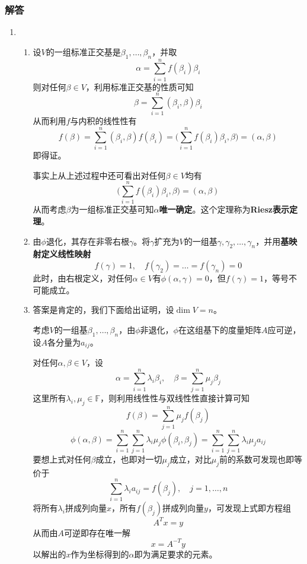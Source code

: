 \documentclass[a4paper,UTF8,fontset=windows,AutoFakeBold]{ctexart}
\newcommand*{\note}{\noindent *}
\begin{document}
\subsubsection{解答}
\begin{enumerate}
    \item
    \begin{enumerate}
        \item 设$V$的一组标准正交基是$\beta_1,\dots,\beta_n$，并取
        $$\alpha=\sum_{i=1}^nf(\beta_i)\beta_i$$
        则对任何$\beta\in V$，利用标准正交基的性质可知
        $$\beta=\sum_{i=1}^n(\beta_i,\beta)\beta_i$$
        从而利用$f$与内积的线性性有
        $$f(\beta)=\sum_{i=1}^n(\beta_i,\beta)f(\beta_i)=\bigg(\sum_{i=1}^nf(\beta_i)\beta_i,\beta\bigg)=(\alpha,\beta)$$
        即得证。

        \note 事实上从上述过程中还可看出对任何$\beta\in V$均有
        $$\bigg(\sum_{i=1}^nf(\beta_i)\beta_i,\beta\bigg)=(\alpha,\beta)$$
        从而考虑$\beta$为一组标准正交基可知$\alpha$\textbf{唯一确定}。这个定理称为\textbf{Riesz表示定理}。

        \item 
        由$\phi$退化，其存在非零右根$\gamma$。将$\gamma$扩充为$V$的一组基$\gamma,\gamma_2,\dots,\gamma_n$，并用\textbf{基映射定义线性映射}
        $$f(\gamma)=1,\quad f(\gamma_2)=\dots=f(\gamma_n)=0$$
        此时，由右根定义，对任何$\alpha\in V$有$\phi(\alpha,\gamma)=0$，但$f(\gamma)=1$，等号不可能成立。

        \item 答案是肯定的，我们下面给出证明，设$\dim V=n$。
        
        考虑$V$的一组基$\beta_1,\dots,\beta_n$，由$\phi$非退化，$\phi$在这组基下的度量矩阵$A$应可逆，设$A$各分量为$a_{ij}$。

        对任何$\alpha,\beta\in V$，设
        $$\alpha=\sum_{i=1}^n\lambda_i\beta_i,\quad\beta=\sum_{j=1}^n\mu_j\beta_j$$
        这里所有$\lambda_i,\mu_j\in\mathbb{F}$，则利用线性性与双线性性直接计算可知
        $$f(\beta)=\sum_{j=1}^n\mu_jf(\beta_j)$$
        $$\phi(\alpha,\beta)=\sum_{i=1}^n\sum_{j=1}^n\lambda_i\mu_j\phi(\beta_i,\beta_j)=\sum_{i=1}^n\sum_{j=1}^n\lambda_i\mu_ja_{ij}$$
        要想上式对任何$\beta$成立，也即对一切$\mu_j$成立，对比$\mu_j$前的系数可发现也即等价于
        $$\sum_{i=1}^n\lambda_ia_{ij}=f(\beta_j),\quad j=1,\dots,n$$
        将所有$\lambda_i$拼成列向量$x$，所有$f(\beta_j)$拼成列向量$y$，可发现上式即方程组
        $$A^Tx=y$$
        从而由$A$可逆即存在唯一解
        $$x=A^{-T}y$$
        以解出的$x$作为坐标得到的$\alpha$即为满足要求的元素。


\end{enumerate}
\end{enumerate}
\end{document}
